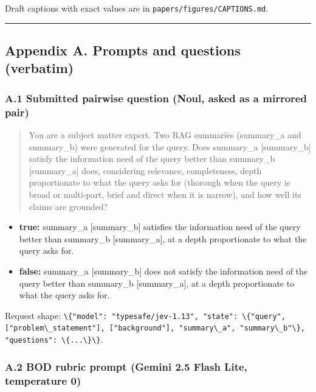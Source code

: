 \documentclass[
  10pt,
]{article}
\newcommand{\passthrough}[1]{#1}
\providecommand{\tightlist}{%
  \setlength{\itemsep}{0pt}\setlength{\parskip}{0pt}}
\begin{document}
Draft captions with exact values are in
\passthrough{\lstinline!papers/figures/CAPTIONS.md!}.

\begin{center}\rule{0.5\linewidth}{0.5pt}\end{center}

\subsection{Appendix A. Prompts and questions
(verbatim)}\label{appendix-a.-prompts-and-questions-verbatim}

\subsubsection{A.1 Submitted pairwise question (Noul, asked as a
mirrored
pair)}\label{a.1-submitted-pairwise-question-noul-asked-as-a-mirrored-pair}

\begin{quote}
You are a subject matter expert. Two RAG summaries (summary\_a and
summary\_b) were generated for the query. Does summary\_a
{[}summary\_b{]} satisfy the information need of the query better than
summary\_b {[}summary\_a{]} does, considering relevance, completeness,
depth proportionate to what the query asks for (thorough when the query
is broad or multi-part, brief and direct when it is narrow), and how
well its claims are grounded?
\end{quote}

\begin{itemize}
\tightlist
\item
  \textbf{true:} summary\_a {[}summary\_b{]} satisfies the information
  need of the query better than summary\_b {[}summary\_a{]}, at a depth
  proportionate to what the query asks for.
\item
  \textbf{false:} summary\_a {[}summary\_b{]} does not satisfy the
  information need of the query better than summary\_b {[}summary\_a{]},
  at a depth proportionate to what the query asks for.
\end{itemize}

Request shape:
\passthrough{\lstinline!\{"model": "typesafe/jev-1.13", "state": \{"query", ["problem\_statement"], ["background"], "summary\_a", "summary\_b"\}, "questions": \{...\}\}!}.

\subsubsection{A.2 BOD rubric prompt (Gemini 2.5 Flash Lite, temperature
0)}\label{a.2-bod-rubric-prompt-gemini-2.5-flash-lite-temperature-0}
\end{document}
